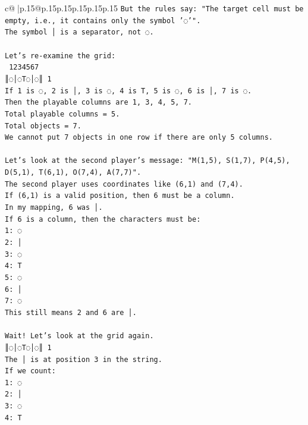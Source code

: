 \documentclass{article}
\begin{document}
{\begin{supertabular}{c@{$\;$}|p{.15\linewidth}@{}p{.15\linewidth}p{.15\linewidth}p{.15\linewidth}p{.15\linewidth}p{.15\linewidth}}
{{{\texttt{But the rules say: "The target cell must be empty, i.e., it contains only the symbol '◌'".} \\
\texttt{The symbol │ is a separator, not ◌.} \\
\\ 
\texttt{Let's re{-}examine the grid:} \\
\texttt{ 1234567} \\
\texttt{║◌│◌T◌│◌║ 1} \\
\texttt{If 1 is ◌, 2 is │, 3 is ◌, 4 is T, 5 is ◌, 6 is │, 7 is ◌.} \\
\texttt{Then the playable columns are 1, 3, 4, 5, 7.} \\
\texttt{Total playable columns = 5.} \\
\texttt{Total objects = 7.} \\
\texttt{We cannot put 7 objects in one row if there are only 5 columns.} \\
\\ 
\texttt{Let's look at the second player's message: "M(1,5), S(1,7), P(4,5), D(5,1), T(6,1), O(7,4), A(7,7)".} \\
\texttt{The second player uses coordinates like (6,1) and (7,4).} \\
\texttt{If (6,1) is a valid position, then 6 must be a column.} \\
\texttt{In my mapping, 6 was │.} \\
\texttt{If 6 is a column, then the characters must be:} \\
\texttt{1: ◌} \\
\texttt{2: │} \\
\texttt{3: ◌} \\
\texttt{4: T} \\
\texttt{5: ◌} \\
\texttt{6: │} \\
\texttt{7: ◌} \\
\texttt{This still means 2 and 6 are │.} \\
\\ 
\texttt{Wait! Let's look at the grid again.} \\
\texttt{║◌│◌T◌│◌║ 1} \\
\texttt{The │ is at position 3 in the string.} \\
\texttt{If we count:} \\
\texttt{1: ◌} \\
\texttt{2: │} \\
\texttt{3: ◌} \\
\texttt{4: T} \\
}}}
\end{supertabular}}
\end{document}

